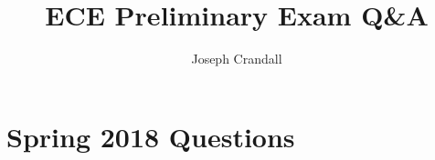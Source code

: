 
\usepackage{algorithm, algpseudocode, color, gensymb, siunitx, soul, subfiles}
\usepackage[a4paper, total={7.5in, 9.5in}]{geometry}

\title{ECE Preliminary Exam Q\&A}
\author{Joseph Crandall}


\maketitle

%

\section{Spring 2018 Questions}


%

%

%

%

%

%


